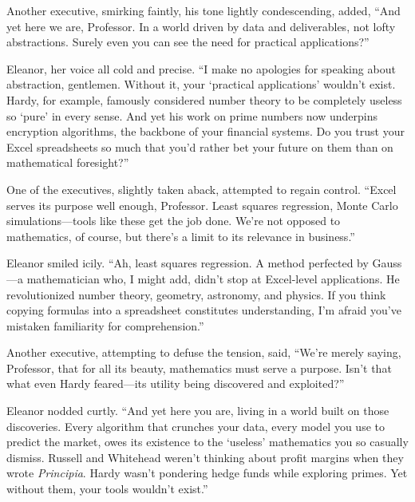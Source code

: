 \smallskip

Another executive, smirking faintly, his tone lightly condescending, added, “And yet here we are, Professor. In a world driven by data and deliverables, not lofty abstractions. Surely even you can see the need for practical applications?”

\smallskip

Eleanor, her voice all cold and precise. “I make no apologies for speaking about abstraction, gentlemen. Without it, your ‘practical applications’ wouldn’t exist. Hardy, for example, famously considered number theory to be completely useless so ‘pure’ in every sense. And yet his work on prime numbers now underpins encryption algorithms, the backbone of your financial systems. Do you trust your Excel spreadsheets so much that you’d rather bet your future on them than on mathematical foresight?”

\smallskip

One of the executives, slightly taken aback, attempted to regain control. “Excel serves its purpose well enough, Professor. Least squares regression, Monte Carlo simulations—tools like these get the job done. We’re not opposed to mathematics, of course, but there’s a limit to its relevance in business.”

\smallskip

Eleanor smiled icily. “Ah, least squares regression. A method perfected by Gauss—a mathematician who, I might add, didn’t stop at Excel-level applications. He revolutionized number theory, geometry, astronomy, and physics. If you think copying formulas into a spreadsheet constitutes understanding, I’m afraid you’ve mistaken familiarity for comprehension.”

\smallskip

Another executive, attempting to defuse the tension, said, “We’re merely saying, Professor, that for all its beauty, mathematics must serve a purpose. Isn’t that what even Hardy feared—its utility being discovered and exploited?”

\smallskip

Eleanor nodded curtly. “And yet here you are, living in a world built on those discoveries. Every algorithm that crunches your data, every model you use to predict the market, owes its existence to the ‘useless’ mathematics you so casually dismiss. Russell and Whitehead weren’t thinking about profit margins when they wrote \textit{Principia}. Hardy wasn’t pondering hedge funds while exploring primes. Yet without them, your tools wouldn’t exist.”

